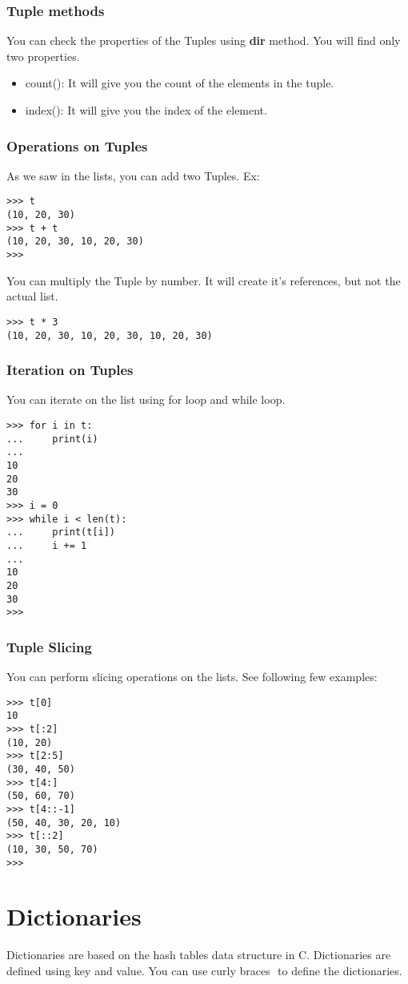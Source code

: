 \documentclass[letterpaper,12pt]{book}
\begin{document}
\subsubsection{Tuple methods}
You can check the properties of the Tuples using \textbf{dir} method. You will find only two properties.
\begin{itemize}
	\item count(): It will give you the count of the elements in the tuple.
	\item index(): It will give you the index of the element.
\end{itemize}
\subsubsection{Operations on Tuples}
As we saw in the lists, you can add two Tuples. Ex:
\begin{lstlisting}
>>> t
(10, 20, 30)
>>> t + t
(10, 20, 30, 10, 20, 30)
>>>
\end{lstlisting}
You can multiply the Tuple by number. It will create it's references, but not the actual list.
\begin{lstlisting}
>>> t * 3
(10, 20, 30, 10, 20, 30, 10, 20, 30)
\end{lstlisting}
\subsubsection{Iteration on Tuples}
You can iterate on the list using for loop and while loop.
\begin{lstlisting}
>>> for i in t:
...     print(i)
... 
10
20
30
>>> i = 0
>>> while i < len(t):
...     print(t[i])
...     i += 1
... 
10
20
30
>>> 
\end{lstlisting}
\subsubsection{Tuple Slicing}
You can perform slicing operations on the lists. See following few examples:
\begin{lstlisting}
>>> t[0]
10
>>> t[:2]
(10, 20)
>>> t[2:5]
(30, 40, 50)
>>> t[4:]
(50, 60, 70)
>>> t[4::-1]
(50, 40, 30, 20, 10)
>>> t[::2]
(10, 30, 50, 70)
>>> 
\end{lstlisting}
\section{Dictionaries}
Dictionaries are based on the hash tables data structure in C. Dictionaries are defined using key and value. You can use curly braces ${}$ to define the dictionaries.
\end{document}
